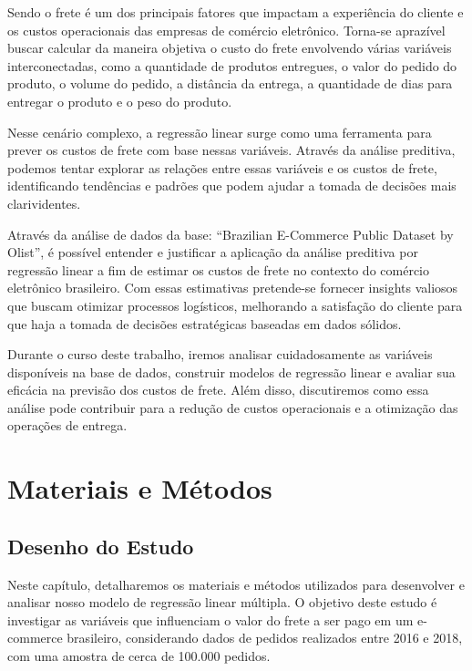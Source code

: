 \documentclass[
]{article}
\begin{document}
Sendo o frete é um dos principais fatores que impactam a experiência do
cliente e os custos operacionais das empresas de comércio eletrônico.
Torna-se aprazível buscar calcular da maneira objetiva o custo do frete
envolvendo várias variáveis interconectadas, como a quantidade de
produtos entregues, o valor do pedido do produto, o volume do pedido, a
distância da entrega, a quantidade de dias para entregar o produto e o
peso do produto.

Nesse cenário complexo, a regressão linear surge como uma ferramenta
para prever os custos de frete com base nessas variáveis. Através da
análise preditiva, podemos tentar explorar as relações entre essas
variáveis e os custos de frete, identificando tendências e padrões que
podem ajudar a tomada de decisões mais clarividentes.

Através da análise de dados da base: ``Brazilian E-Commerce Public
Dataset by Olist'', é possível entender e justificar a aplicação da
análise preditiva por regressão linear a fim de estimar os custos de
frete no contexto do comércio eletrônico brasileiro. Com essas
estimativas pretende-se fornecer insights valiosos que buscam otimizar
processos logísticos, melhorando a satisfação do cliente para que haja a
tomada de decisões estratégicas baseadas em dados sólidos.

Durante o curso deste trabalho, iremos analisar cuidadosamente as
variáveis disponíveis na base de dados, construir modelos de regressão
linear e avaliar sua eficácia na previsão dos custos de frete. Além
disso, discutiremos como essa análise pode contribuir para a redução de
custos operacionais e a otimização das operações de entrega.

\hypertarget{materiais-e-muxe9todos}{%
\section{Materiais e Métodos}\label{materiais-e-muxe9todos}}

\hypertarget{desenho-do-estudo}{%
\subsection{Desenho do Estudo}\label{desenho-do-estudo}}

Neste capítulo, detalharemos os materiais e métodos utilizados para
desenvolver e analisar nosso modelo de regressão linear múltipla. O
objetivo deste estudo é investigar as variáveis que influenciam o valor
do frete a ser pago em um e-commerce brasileiro, considerando dados de
pedidos realizados entre 2016 e 2018, com uma amostra de cerca de
100.000 pedidos.
\end{document}
